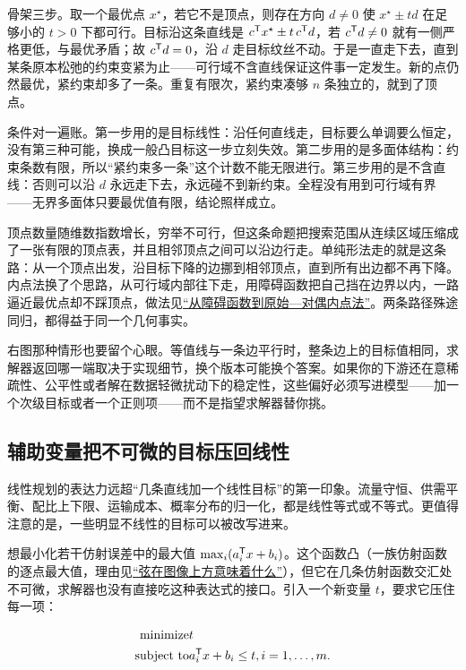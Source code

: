 骨架三步。取一个最优点 \(x^\star\)，若它不是顶点，则存在方向 \(d\ne0\) 使 \(x^\star\pm td\) 在足够小的 \(t>0\) 下都可行。目标沿这条直线是 \(c^{\mathsf{T}}x^\star\pm t\,c^{\mathsf{T}}d\)，若 \(c^{\mathsf{T}}d\ne0\) 就有一侧严格更低，与最优矛盾；故 \(c^{\mathsf{T}}d=0\)，沿 \(d\) 走目标纹丝不动。于是一直走下去，直到某条原本松弛的约束变紧为止——可行域不含直线保证这件事一定发生。新的点仍然最优，紧约束却多了一条。重复有限次，紧约束凑够 \(n\) 条独立的，就到了顶点。

条件对一遍账。第一步用的是目标线性：沿任何直线走，目标要么单调要么恒定，没有第三种可能，换成一般凸目标这一步立刻失效。第二步用的是多面体结构：约束条数有限，所以``紧约束多一条''这个计数不能无限进行。第三步用的是不含直线：否则可以沿 \(d\) 永远走下去，永远碰不到新约束。全程没有用到可行域有界——无界多面体只要最优值有限，结论照样成立。

顶点数量随维数指数增长，穷举不可行，但这条命题把搜索范围从连续区域压缩成了一张有限的顶点表，并且相邻顶点之间可以沿边行走。单纯形法走的就是这条路：从一个顶点出发，沿目标下降的边挪到相邻顶点，直到所有出边都不再下降。内点法换了个思路，从可行域内部往下走，用障碍函数把自己挡在边界以内，一路逼近最优点却不踩顶点，做法见\hyperref[sec:09-Convex-Optimization/06-Optimization-Algorithms/05]{``从障碍函数到原始---对偶内点法''}。两条路径殊途同归，都得益于同一个几何事实。

右图那种情形也要留个心眼。等值线与一条边平行时，整条边上的目标值相同，求解器返回哪一端取决于实现细节，换个版本可能换个答案。如果你的下游还在意稀疏性、公平性或者解在数据轻微扰动下的稳定性，这些偏好必须写进模型——加一个次级目标或者一个正则项——而不是指望求解器替你挑。

\subsection{辅助变量把不可微的目标压回线性}

线性规划的表达力远超``几条直线加一个线性目标''的第一印象。流量守恒、供需平衡、配比上下限、运输成本、概率分布的归一化，都是线性等式或不等式。更值得注意的是，一些明显不线性的目标可以被改写进来。

想最小化若干仿射误差中的最大值 \(\max_i(a_i^{\mathsf{T}}x+b_i)\)。这个函数凸（一族仿射函数的逐点最大值，理由见\hyperref[sec:09-Convex-Optimization/03-Convex-Functions/01]{``弦在图像上方意味着什么''}），但它在几条仿射函数交汇处不可微，求解器也没有直接吃这种表达式的接口。引入一个新变量 \(t\)，要求它压住每一项：

\[
\begin{aligned}
\text{minimize}\space &t\\
\text{subject to}\space &a_i^{\mathsf{T}}x+b_i\le t,\space i=1,\ldots,m.
\end{aligned}
\]

